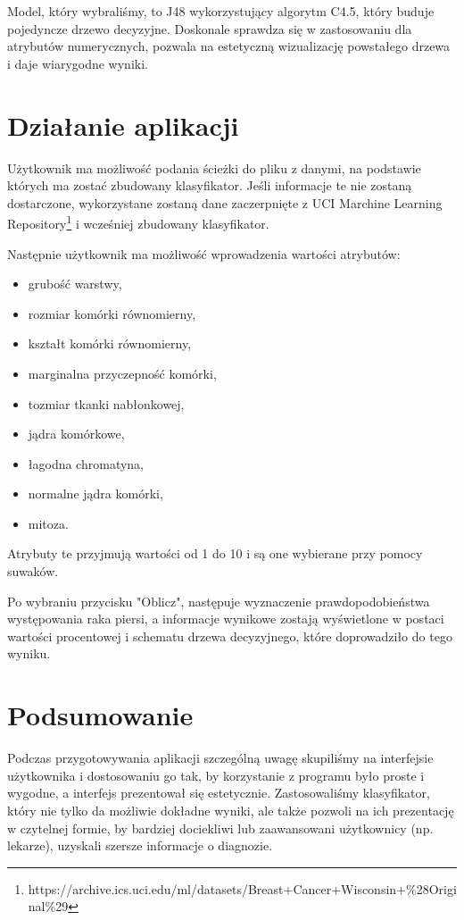 \documentclass{article}
\begin{document}
Model, który wybraliśmy, to J48 wykorzystujący algorytm C4.5, który buduje pojedyncze drzewo decyzyjne. Doskonale sprawdza się w zastosowaniu dla atrybutów numerycznych, pozwala na estetyczną wizualizację powstałego drzewa i daje wiarygodne wyniki.

\section{Działanie aplikacji}

Użytkownik ma możliwość podania ścieżki do pliku z danymi, na podstawie których ma zostać zbudowany klasyfikator. Jeśli informacje te nie zostaną dostarczone, wykorzystane zostaną dane zaczerpnięte z UCI Marchine Learning Repository\footnote{https://archive.ics.uci.edu/ml/datasets/Breast+Cancer+Wisconsin+\%28Original\%29} i wcześniej zbudowany klasyfikator.

Następnie użytkownik ma możliwość wprowadzenia wartości atrybutów:
\begin{itemize}
\item grubość warstwy,
\item rozmiar komórki równomierny,
\item kształt komórki równomierny,
\item marginalna przyczepność komórki,
\item tozmiar tkanki nabłonkowej,
\item jądra komórkowe,
\item łagodna chromatyna,
\item normalne jądra komórki,
\item mitoza.
\end{itemize}
Atrybuty te przyjmują wartości od 1 do 10 i są one wybierane przy pomocy suwaków.

Po wybraniu przycisku "Oblicz", następuje wyznaczenie prawdopodobieństwa występowania raka piersi, a informacje wynikowe zostają wyświetlone w postaci wartości procentowej i schematu drzewa decyzyjnego, które doprowadziło do tego wyniku.

\section{Podsumowanie}

Podczas przygotowywania aplikacji szczególną uwagę skupiliśmy na interfejsie użytkownika i dostosowaniu go tak, by korzystanie z programu było proste i wygodne, a interfejs prezentował się estetycznie. Zastosowaliśmy klasyfikator, który nie tylko da możliwie dokładne wyniki, ale także pozwoli na ich prezentację w czytelnej formie, by bardziej dociekliwi lub zaawansowani użytkownicy (np. lekarze), uzyskali szersze informacje o diagnozie.
\end{document}
